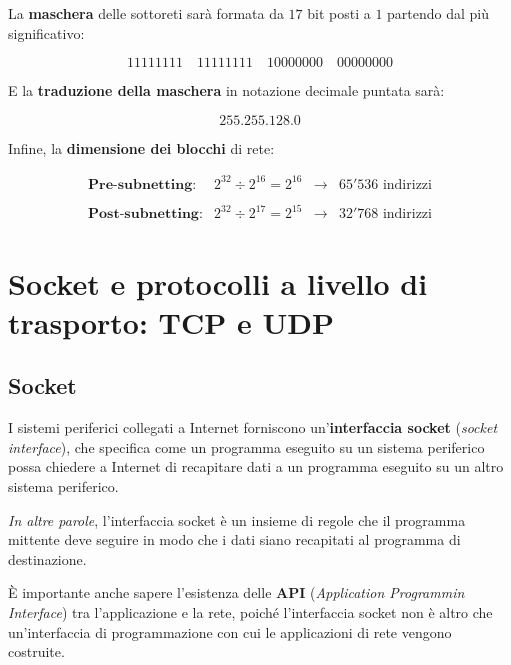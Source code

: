 \documentclass[a4paper]{article}
\newcommand{\binaryaddress}[4]{#1 \hspace{1em} #2 \hspace{1em} #3 \hspace{1em} #4}
\begin{document}
	\noindent
	La \textbf{maschera} delle sottoreti sarà formata da $17$ bit posti a $1$ partendo dal più significativo:
	
	\begin{equation*}
		\binaryaddress{11111111}{11111111}{10000000}{00000000}
	\end{equation*}

	\noindent
	E la \textbf{traduzione della maschera} in notazione decimale puntata sarà:
	
	\begin{equation*}
		255.255.128.0
	\end{equation*}

	\noindent
	Infine, la \textbf{dimensione dei blocchi} di rete:
	
	\begin{equation*}
		\begin{array}{llll}
			\textbf{Pre-subnetting}:	&	2^{32} \div 2^{16} = 2^{16}	&	\longrightarrow	&	65'536 \text{ indirizzi} \\
			&&& \\
			\textbf{Post-subnetting}: 	&	2^{32} \div 2^{17} = 2^{15}	&	\longrightarrow	&	32'768 \text{ indirizzi}
		\end{array}
	\end{equation*}

	\newpage
	
	\section{Socket e protocolli a livello di trasporto: TCP e UDP}
	
	\subsection{Socket}
	
	I sistemi periferici collegati a Internet forniscono un'\textcolor{Red3}{\textbf{interfaccia socket}} (\emph{socket interface}), che specifica come un programma eseguito su un sistema periferico possa chiedere a Internet di recapitare dati a un programma eseguito su un altro sistema periferico.\newline
	
	\noindent
	\emph{In altre parole}, l’interfaccia socket è un insieme di regole che il programma mittente deve seguire in modo che i dati siano recapitati al programma di destinazione.\newline
	
	\noindent
	È importante anche sapere l’esistenza delle \textbf{API} (\emph{Application Programmin Interface}) tra l’applicazione e la rete, poiché l’interfaccia socket non è altro che un’interfaccia di programmazione con cui le applicazioni di rete vengono costruite.\newline
	
\end{document}
